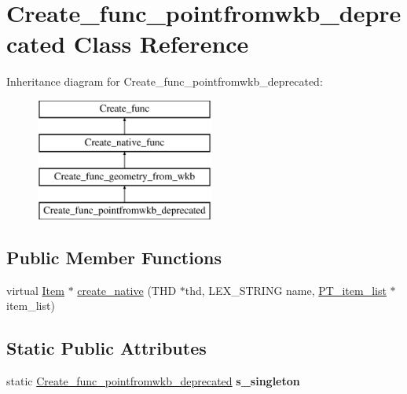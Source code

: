\hypertarget{classCreate__func__pointfromwkb__deprecated}{}\section{Create\+\_\+func\+\_\+pointfromwkb\+\_\+deprecated Class Reference}
\label{classCreate__func__pointfromwkb__deprecated}
Inheritance diagram for Create\+\_\+func\+\_\+pointfromwkb\+\_\+deprecated\+:\begin{figure}[H]
\begin{center}
\leavevmode
\includegraphics[height=4.000000cm]{classCreate__func__pointfromwkb__deprecated}
\end{center}
\end{figure}
\subsection*{Public Member Functions}
\begin{DoxyCompactItemize}
\item 
virtual \mbox{\hyperlink{classItem}{Item}} $\ast$ \mbox{\hyperlink{classCreate__func__pointfromwkb__deprecated_a3d3d96288a0fd07206e11c3b3f5277bc}{create\+\_\+native}} (T\+HD $\ast$thd, L\+E\+X\+\_\+\+S\+T\+R\+I\+NG name, \mbox{\hyperlink{classPT__item__list}{P\+T\+\_\+item\+\_\+list}} $\ast$item\+\_\+list)
\end{DoxyCompactItemize}
\subsection*{Static Public Attributes}
\begin{DoxyCompactItemize}
\item 
\mbox{\label{classCreate__func__pointfromwkb__deprecated_ab01330d808ddd05e5ac19552cbb7d3cc}} 
static \mbox{\hyperlink{classCreate__func__pointfromwkb__deprecated}{Create\+\_\+func\+\_\+pointfromwkb\+\_\+deprecated}} {\bfseries s\+\_\+singleton}
\end{DoxyCompactItemize}
